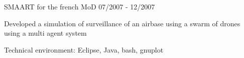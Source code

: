 \begin{cventries}
  \cventry
    {SMAART for the french MoD}
    {}
    {}
    {07/2007 - 12/2007}
    {
      \begin{cvitems}
        \item {Developed a simulation of surveillance of an airbase using a
            swarm of drones using a multi agent system}
        \item {Technical environment: Eclipse, Java, bash, gnuplot}
      \end{cvitems}
    }

\end{cventries}
